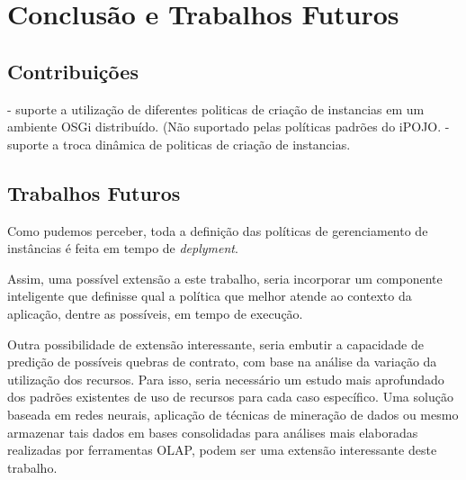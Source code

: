 \chapter{Conclusão e Trabalhos Futuros}
\label{ch:5}

\section{Contribuições}

- suporte a utilização de diferentes politicas de criação de instancias em um ambiente OSGi distribuído. (Não suportado pelas políticas padrões do iPOJO.
- suporte a troca dinâmica de politicas de criação de instancias.


\section{Trabalhos Futuros}
Como pudemos perceber, toda a definição das políticas de gerenciamento de instâncias é feita em tempo de \textit{deplyment}. 

Assim, uma possível extensão a este trabalho, seria incorporar um componente inteligente que definisse qual a política que melhor atende ao contexto da aplicação, dentre as possíveis, em tempo de execução.

Outra possibilidade de extensão interessante, seria embutir a capacidade de predição de possíveis quebras de contrato, com base na análise da variação da utilização dos recursos. Para isso, seria necessário um estudo mais aprofundado dos padrões existentes de uso de recursos para cada caso específico. Uma solução baseada em redes neurais, aplicação de técnicas de mineração de dados ou mesmo armazenar tais dados em bases consolidadas para análises mais elaboradas realizadas por ferramentas OLAP, podem ser uma extensão interessante deste trabalho.